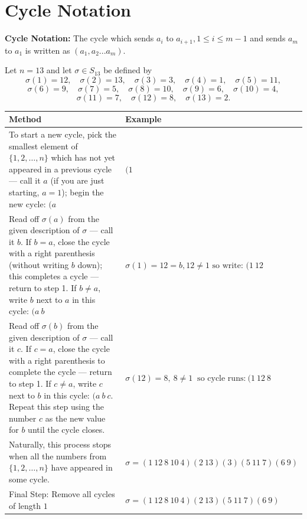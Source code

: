 \section{Cycle Notation}
\textbf{Cycle Notation:} The cycle which sends $a_i$ to $a_{i+1}, 1 \le i \le m-1$ and sends $a_m$ to $a_1$ is written as  $(a_1, a_2 ... a_m)$.
\begin{eg}  
Let $n = 13$ and let $\sigma \in S_{13}$ be defined by
\[
\sigma(1) = 12, \quad \sigma(2) = 13, \quad \sigma(3) = 3, \quad \sigma(4) = 1, \quad \sigma(5) = 11,
\]
\[
\sigma(6) = 9, \quad \sigma(7) = 5, \quad \sigma(8) = 10, \quad \sigma(9) = 6, \quad \sigma(10) = 4,
\]
\[
\sigma(11) = 7, \quad \sigma(12) = 8, \quad \sigma(13) = 2.
\]

\begin{center}
    \def\arraystretch{2}
    \begin{tabular}{|p{}|p{}|}
    \hline
    \textbf{Method} & \textbf{Example} \\ \hline
    To start a new cycle, pick the smallest element of $\{1, 2, \ldots, n\}$ which has not yet appeared in a previous cycle --- call it $a$ (if you are just starting, $a = 1$); begin the new cycle: $(a$ & $(1$ \\ \hline
    Read off $\sigma(a)$ from the given description of $\sigma$ --- call it $b$. If $b = a$, close the cycle with a right parenthesis (without writing $b$ down); this completes a cycle --- return to step 1. If $b \neq a$, write $b$ next to $a$ in this cycle: $(a\ b$ & $\sigma(1) = 12 = b,  12 \neq 1  \text{ so write: }  (1\ 12$ \\ \hline
    Read off $\sigma(b)$ from the given description of $\sigma$ --- call it $c$. If $c = a$, close the cycle with a right parenthesis to complete the cycle --- return to step 1. If $c \neq a$, write $c$ next to $b$ in this cycle: $(a\ b\ c$. Repeat this step using the number $c$ as the new value for $b$ until the cycle closes. & $\sigma(12) = 8, \ 8 \neq 1 \ \text{ so cycle runs:} \ (1\ 12\ 8$ \\ \hline
    Naturally, this process stops when all the numbers from $\{1, 2, \ldots, n\}$ have appeared in some cycle. & $\sigma = (1 \ 12 \ 8 \ 10 \ 4)(2 \ 13)(3)(5 \ 11 \ 7)(6 \ 9)$\\ \hline
    Final Step: Remove all cycles of length $1$ & $\sigma = (1 \ 12 \ 8 \ 10 \ 4)(2 \ 13)(5 \ 11 \ 7)(6 \ 9)$ \\ \hline
    \end{tabular}
\end{center}
\end{eg}
